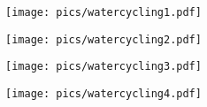 \documentclass[11pt,letterpaper,twoside,onecolumn]{memoir}
\begin{document}
\begin{figure}
\centering
\texttt{[image: pics/watercycling1.pdf]}
\end{figure}
\begin{figure}
\centering
\texttt{[image: pics/watercycling2.pdf]}
\end{figure}
\begin{figure}
\centering
\texttt{[image: pics/watercycling3.pdf]}
\end{figure}
\begin{figure}
\centering
\texttt{[image: pics/watercycling4.pdf]}
\end{figure}
\end{document}
